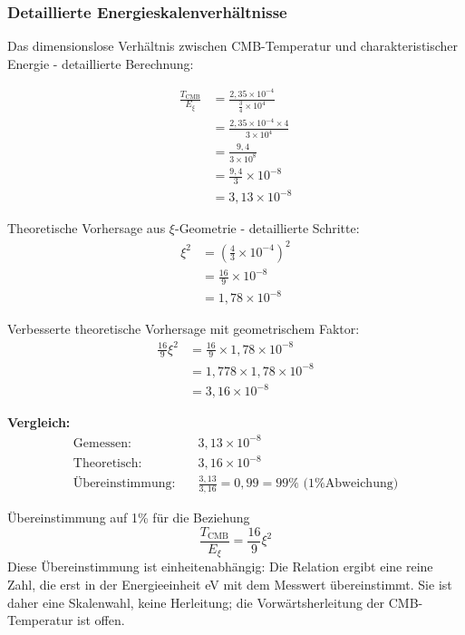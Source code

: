 	\subsubsection{Detaillierte Energieskalenverhältnisse}
	
	Das dimensionslose Verhältnis zwischen CMB-Temperatur und charakteristischer Energie - detaillierte Berechnung:
	
	\begin{align}
		\frac{T_{\text{CMB}}}{E_\xi} &= \frac{2,35 \times 10^{-4}}{\frac{3}{4} \times 10^4} \\
		&= \frac{2,35 \times 10^{-4} \times 4}{3 \times 10^4} \\
		&= \frac{9,4}{3 \times 10^8} \\
		&= \frac{9,4}{3} \times 10^{-8} \\
		&= 3,13 \times 10^{-8}
	\end{align}
	
	Theoretische Vorhersage aus $\xi$-Geometrie - detaillierte Schritte:
	\begin{align}
		\xi^2 &= \left(\frac{4}{3} \times 10^{-4}\right)^2 \\
		&= \frac{16}{9} \times 10^{-8} \\
		&= 1,78 \times 10^{-8}
	\end{align}
	
	Verbesserte theoretische Vorhersage mit geometrischem Faktor:
	\begin{align}
		\frac{16}{9}\xi^2 &= \frac{16}{9} \times 1,78 \times 10^{-8} \\
		&= 1,778 \times 1,78 \times 10^{-8} \\
		&= 3,16 \times 10^{-8}
	\end{align}
	
	\textbf{Vergleich:}
	\begin{align}
		\text{Gemessen:} \quad &3,13 \times 10^{-8} \\
		\text{Theoretisch:} \quad &3,16 \times 10^{-8} \\
		\text{Übereinstimmung:} \quad &\frac{3,13}{3,16} = 0,99 = 99\% \text{ (1\% Abweichung)}
	\end{align}
	
	Übereinstimmung auf 1\% für die Beziehung
	\begin{equation}
		\boxed{\frac{T_{\text{CMB}}}{E_\xi} = \frac{16}{9}\xi^2}
	\end{equation}
	Diese Übereinstimmung ist einheitenabhängig: Die Relation ergibt eine reine Zahl, die erst in der Energieeinheit eV mit dem Messwert übereinstimmt. Sie ist daher eine Skalenwahl, keine Herleitung; die Vorwärtsherleitung der CMB-Temperatur ist offen.
	
